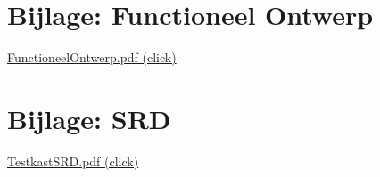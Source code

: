 \appendix

\section{Bijlage: Functioneel Ontwerp} \label{sec:FunctioneelOntwerp}

\href{run:FunctioneelOntwerp.pdf}{FunctioneelOntwerp.pdf (click)}

\section{Bijlage: \gls{SRD}} \label{sec:SRD}

\href{run:TestkastSRD.pdf}{TestkastSRD.pdf (click)}